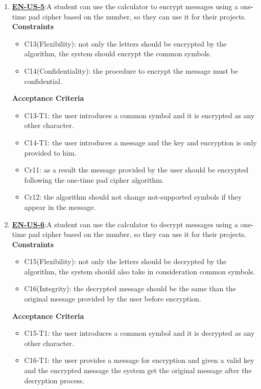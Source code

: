 \documentclass{report}
\begin{document}
\begin{enumerate}
\item \underline{\textbf{EN-US-5}}:A student can use the calculator to encrypt messages using a one-time pad cipher based on the number, so they can use it for their projects. \\ \newline
\textbf{Constraints}
\begin{itemize}
    \item C13(Flexibility): not only the letters should be encrypted by the algorithm, the system should encrypt the common symbols. 
    \item C14(Confidentiality): the procedure to encrypt the message must be confidential.
\end{itemize}

\textbf{Acceptance Criteria}
\begin{itemize}
    \item C13-T1: the user introduces a common symbol and it is encrypted as any other character.
    \item C14-T1: the user introduces a message and the key and encryption is only provided to him.

    \item Cr11: as a result the message provided by the user should be encrypted following the one-time pad cipher algorithm.
    \item Cr12: the algorithm should not change not-supported symbols if they appear in the message. \newline
\end{itemize}

\item \underline{\textbf{EN-US-6}}:A student can use the calculator to decrypt messages using a one-time pad cipher based on the number, so they can use it for their projects. \\ \newline
\textbf{Constraints}
\begin{itemize}
    \item C15(Flexibility): not only the letters should be decrypted by the algorithm, the system should also take in consideration common symbols. 
    \item C16(Integrity): the decrypted message should be the same than the original message provided by the user before encryption.
\end{itemize}

\textbf{Acceptance Criteria}
\begin{itemize}
    \item C15-T1: the user introduces a common symbol and it is decrypted as any other character.
    \item C16-T1: the user provides a message for encryption and given a valid key and the encrypted message the system get the original message after the decryption process.


\end{itemize}
\end{enumerate}
\end{document}
